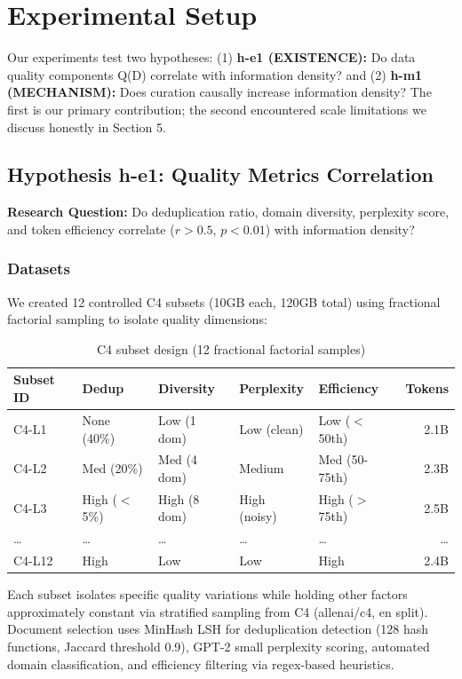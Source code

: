 \section{Experimental Setup}

Our experiments test two hypotheses: (1) \textbf{h-e1 (EXISTENCE):} Do data quality components Q(D) correlate with information density? and (2) \textbf{h-m1 (MECHANISM):} Does curation causally increase information density? The first is our primary contribution; the second encountered scale limitations we discuss honestly in Section 5.

\subsection{Hypothesis h-e1: Quality Metrics Correlation}

\textbf{Research Question:} Do deduplication ratio, domain diversity, perplexity score, and token efficiency correlate ($r > 0.5$, $p < 0.01$) with information density?

\subsubsection{Datasets}

We created 12 controlled C4 subsets (10GB each, 120GB total) using fractional factorial sampling to isolate quality dimensions:

\begin{table}[h]
\centering
\small
\begin{tabular}{lllllr}
\hline
\textbf{Subset ID} & \textbf{Dedup} & \textbf{Diversity} & \textbf{Perplexity} & \textbf{Efficiency} & \textbf{Tokens} \\
\hline
C4-L1 & None (40\%) & Low (1 dom) & Low (clean) & Low ($<$50th) & 2.1B \\
C4-L2 & Med (20\%) & Med (4 dom) & Medium & Med (50-75th) & 2.3B \\
C4-L3 & High ($<$5\%) & High (8 dom) & High (noisy) & High ($>$75th) & 2.5B \\
\ldots & \ldots & \ldots & \ldots & \ldots & \ldots \\
C4-L12 & High & Low & Low & High & 2.4B \\
\hline
\end{tabular}
\caption{C4 subset design (12 fractional factorial samples)}
\end{table}

Each subset isolates specific quality variations while holding other factors approximately constant via stratified sampling from C4 (allenai/c4, en split). Document selection uses MinHash LSH for deduplication detection (128 hash functions, Jaccard threshold 0.9), GPT-2 small perplexity scoring, automated domain classification, and efficiency filtering via regex-based heuristics.

